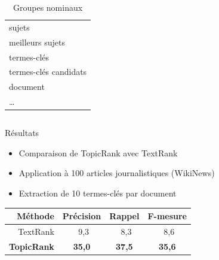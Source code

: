 \documentclass[final, xcolor={usenames, dvipsnames}]{beamer}
\begin{document}
\begin{frame}[b]{}
\begin{columns}[b]
\begin{column}{.45\linewidth}
\begin{columns}
\begin{column}{.45\linewidth}
\begin{center}
              \vspace{.75em}

              \begin{table}
                \begin{tabular}{|@{~-~}l|}
                  \hline
                  sujets\\
                  meilleurs sujets\\
                  termes-clés\\
                  termes-clés candidats\\
                  document\\
                  \dots\\
                  \hline
                \end{tabular}
                \caption{Groupes nominaux}
              \end{table}
            \end{center}
          \end{column}
        \end{columns}

        \begin{block}{Résultats}
          \begin{itemize}
            \item{Comparaison de TopicRank avec TextRank~\cite{mihalcea2004textrank}}
            \item{Application à 100 articles journalistiques (WikiNews)}
            \item{Extraction de 10 termes-clés par document}
          \end{itemize}
          \begin{table}
            \centering
            \begin{tabular}{r|ccc}
              \toprule
              \textbf{Méthode} & \textbf{Précision} & \textbf{Rappel} & \textbf{F-mesure}\\
              \hline
              TextRank & $~~$9,3 & $~~$8,3 & $~~$8,6\\
              \textbf{TopicRank} & \textbf{35,0} & \textbf{37,5} & \textbf{35,6}\\
              \bottomrule
            \end{tabular}
          \end{table}
        \end{block}
      \end{column}


\end{columns}
\end{frame}
\end{document}

